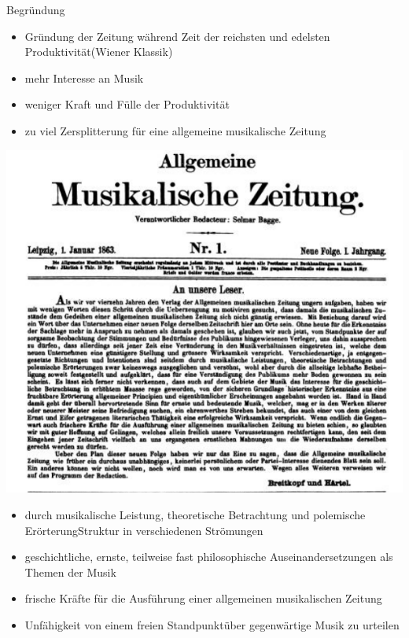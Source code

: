 \documentclass[aspectratio=169]{beamer}
\begin{document}
\begin{frame}
	\begin{block}{Begründung}
	\begin{itemize}
		\item Gründung der Zeitung während \glqq Zeit der reichsten und edelsten Produktivität\grqq (Wiener Klassik)
		\item mehr Interesse an Musik
		\item weniger \glqq Kraft und Fülle der Produktivität\grqq
		\item zu viel Zersplitterung für eine \glqq allgemeine musikalische Zeitung\grqq
	\end{itemize}
	\end{block}
\end{frame}
\begin{frame}
	\includegraphics[scale=.43]{"data/hello.png"}
\end{frame}
\begin{frame}
	\begin{itemize}
		\item durch \glqq musikalische Leistung, theoretische Betrachtung und polemische Erörterung\grqq Struktur in verschiedenen Strömungen
		\item geschichtliche, ernste, teilweise fast philosophische Auseinandersetzungen als Themen der Musik
		\item \glqq frische Kräfte für die Ausführung einer allgemeinen musikalischen Zeitung\grqq
		\item Unfähigkeit von einem \glqq freien Standpunkt\grqq über gegenwärtige Musik zu urteilen
	\end{itemize}
\end{frame}
\end{document}
